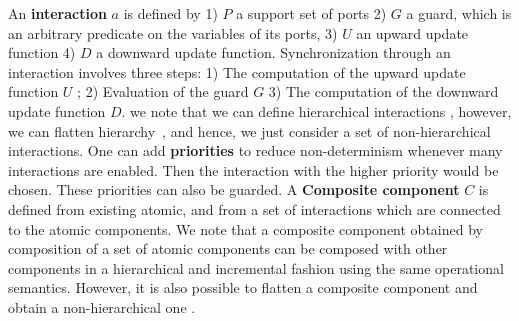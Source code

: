 An \textbf{interaction} $a$ is defined by 1) $P$ a support set of ports 2) $G$ a guard, which is an arbitrary predicate on the variables of its ports, 3) $U$ an upward update function 4) $D$ a downward update function.\newline
Synchronization through an interaction involves three steps: 1) The computation of the upward update function $U$ ; 2) Evaluation of the guard $G$ 3) The computation of the downward update function $D$. we note that we can define hierarchical interactions \cite{verif:bs08,verif:bs09}, however, we can flatten hierarchy~\cite{verif:bjs09}, and hence, we just consider a set of non-hierarchical interactions. \newline
One can add \textbf{priorities} to reduce non-determinism whenever many interactions are enabled. Then the interaction with the higher priority would be chosen. These priorities can also be guarded.\newline
A \textbf{Composite component} $C$ is defined from existing atomic, and from a set of interactions which are connected to the atomic components. We note that a composite component obtained by composition of a set of atomic components can be composed with other components in a hierarchical and incremental fashion using the same operational semantics. However, it is also possible to flatten a composite component and obtain a non-hierarchical one \cite{verif:bjs09}.




